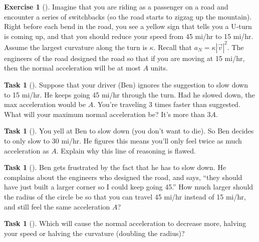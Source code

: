 \documentclass[10pt,]{book}
\theoremstyle{plain}
\theoremstyle{definition}
\theoremstyle{definition}
\theoremstyle{definition}
\theoremstyle{definition}
\newtheorem{exploration}[project]{Exercise}
\newtheorem{task}[project]{Task}
\theoremstyle{definition}
\numberwithin{equation}{section}
\begin{document}
\begin{exploration}[]\label{exploration-183}
Imagine that you are riding as a passenger on a road and encounter a series of switchbacks (so the road starts to zigzag up the mountain). Right before each bend in the road, you see a yellow sign that tells you a U-turn is coming up, and that you should reduce your speed from 45 mi/hr to 15 mi/hr. Assume the largest curvature along the turn is \(\kappa\). Recall that \(a_N=\kappa |\vec v|^2\). The engineers of the road designed the road so that if you are moving at 15 mi/hr, then the normal acceleration will be at most \(A\) units.%
\begin{task}[]\label{task-453}
Suppose that your driver (Ben) ignores the suggestion to slow down to 15 mi/hr.  He keeps going 45 mi/hr through the turn. Had he slowed down, the max acceleration would be \(A\).  You're traveling 3 times faster than suggested.  What will your maximum normal acceleration be? It's more than \(3A\).%
%
\end{task}
\begin{task}[]\label{task-454}
You yell at Ben to slow down (you don't want to die). So Ben decides to only slow to 30 mi/hr. He figures this means you'll only feel twice as much acceleration as \(A\).  Explain why this line of reasoning is flawed.%
\end{task}
\begin{task}[]\label{task-455}
Ben gets frustrated by the fact that he has to slow down. He complains about the engineers who designed the road, and says, ``they should have just built a larger corner so I could keep going 45.''  How much larger should the radius of the circle be so that you can travel 45 mi/hr instead of 15 mi/hr, and still feel the same acceleration \(A\)?%
\end{task}
\begin{task}[]\label{task-456}
Which will cause the normal acceleration to decrease more, halving your speed or halving the curvature (doubling the radius)?%
\end{task}
\end{exploration}
\end{document}
